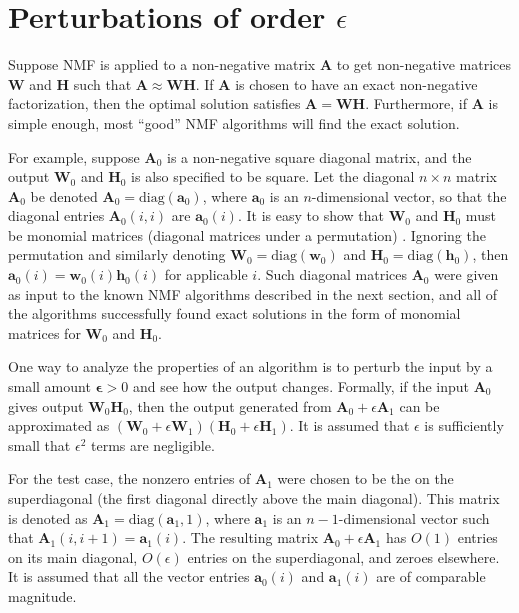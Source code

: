 \documentclass[conference]{IEEEtran}
\begin{document}

\section{Perturbations of order $ \epsilon $}
Suppose NMF is applied to a non-negative matrix $ \mathbf{A} $ to get non-negative matrices $ \mathbf{W} $ and $ \mathbf{H} $ such that $ \mathbf{A} \approx \mathbf{W} \mathbf{H} $.  If $ \mathbf{A} $ is chosen to have an exact non-negative factorization, then the optimal solution satisfies $ \mathbf{A} = \mathbf{WH} $. Furthermore, if $ \mathbf{A} $ is simple enough, most ``good'' NMF algorithms will find the exact solution.

For example, suppose $ \mathbf{A}_0 $ is a non-negative square diagonal matrix, and the output $ \mathbf{W}_0 $ and $ \mathbf{H}_0 $ is also specified to be square.   Let the diagonal $ n \times n $ matrix $ \mathbf{A}_0 $ be denoted $ \mathbf{A}_0 = \text{diag}(\mathbf{a}_0) $, where $ \mathbf{a}_0 $ is an $ n $-dimensional vector, so that the diagonal entries $ \mathbf{A}_0(i,i) $ are $ \mathbf{a}_0(i) $.  It is easy to show that $ \mathbf{W}_0 $ and $ \mathbf{H}_0 $ must be monomial matrices (diagonal matrices under a permutation) \cite{proof}.  Ignoring the permutation and similarly denoting $ \mathbf{W}_0 = \text{diag}(\mathbf{w}_0) $ and $ \mathbf{H}_0 = \text{diag}(\mathbf{h}_0) $, then $ \mathbf{a}_0(i) = \mathbf{w}_0(i) \mathbf{h}_0(i) $ for applicable $ i $.  Such diagonal matrices $ \mathbf{A}_0 $ were given as input to the known NMF algorithms described in the next section, and all of the algorithms successfully found exact solutions in the form of monomial matrices for $ \mathbf{W}_0 $ and $ \mathbf{H}_0 $.

One way to analyze the properties of an algorithm is to perturb the input by a small amount $ \mathbf{\epsilon} > 0 $ and see how the output changes.  Formally, if the input $ \mathbf{A}_0 $ gives output $ \mathbf{W}_0\mathbf{H}_0 $, then the output generated from $ \mathbf{A}_0 + \epsilon \mathbf{A}_1 $ can be approximated as $ (\mathbf{W}_0 + \epsilon \mathbf{W}_1)(\mathbf{H}_0 + \epsilon \mathbf{H}_1) $.  It is assumed that $ \epsilon $ is sufficiently small that $ \epsilon^2 $ terms are negligible.

For the test case, the nonzero entries of $ \mathbf{A}_1 $ were chosen to be the on the superdiagonal (the first diagonal directly above the main diagonal).  This matrix is denoted  as $ \mathbf{A}_1 = \text{diag}(\mathbf{a}_1, 1) $, where $ \mathbf{a}_1 $ is an $ n-1 $-dimensional vector such that $ \mathbf{A}_1(i,i+1) = \mathbf{a}_1(i) $.  The resulting matrix $ \mathbf{A}_0 + \epsilon \mathbf{A}_1 $ has $O(1)$ entries on its main diagonal, $O(\epsilon) $ entries on the superdiagonal, and zeroes elsewhere.  It is assumed that all the vector entries $ \mathbf{a}_0(i) $ and $ \mathbf{a}_1(i) $ are of comparable magnitude.
\end{document}
